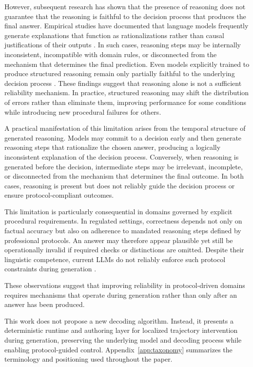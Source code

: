 \documentclass[twocolumn]{article}
\begin{document}
However, subsequent research has shown that the presence of reasoning does not
guarantee that the reasoning is faithful to the decision process that produces
the final answer. Empirical studies have documented that language models
frequently generate explanations that function as rationalizations rather than
causal justifications of their outputs
\parencite{lyu2023faithfulcot,paul2024makingreasoningmatter}. In such cases,
reasoning steps may be internally inconsistent, incompatible with domain rules,
or disconnected from the mechanism that determines the final prediction. Even
models explicitly trained to produce structured reasoning remain only partially
faithful to the underlying decision process \parencite{yun2025medprm}. These
findings suggest that reasoning alone is not a sufficient reliability mechanism.
In practice, structured reasoning may shift the distribution of errors rather
than eliminate them, improving performance for some conditions while introducing
new procedural failures for others.

A practical manifestation of this limitation arises from the temporal structure
of generated reasoning. Models may commit to a decision early and then generate
reasoning steps that rationalize the chosen answer, producing a logically
inconsistent explanation of the decision process. Conversely, when reasoning is
generated before the decision, intermediate steps may be irrelevant, incomplete,
or disconnected from the mechanism that determines the final outcome. In both
cases, reasoning is present but does not reliably guide the decision process or
ensure protocol-compliant outcomes.

This limitation is particularly consequential in domains governed by explicit
procedural requirements. In regulated settings, correctness depends not only on
factual accuracy but also on adherence to mandated reasoning steps defined by
professional protocols. An answer may therefore appear plausible yet still be
operationally invalid if required checks or distinctions are omitted. Despite
their linguistic competence, current LLMs do not reliably enforce such protocol
constraints during generation
\parencite{wei2022cot,yao2023react,liu2023trustworthy,lyu2023faithfulcot}.

These observations suggest that improving reliability in protocol-driven domains
requires mechanisms that operate during generation rather than only after an
answer has been produced.

This work does not propose a new decoding algorithm. Instead, it presents a
deterministic runtime and authoring layer for localized trajectory intervention
during generation, preserving the underlying model and decoding process while
enabling protocol-guided control. Appendix~\ref{app:taxonomy} summarizes the
terminology and positioning used throughout the paper. 
\end{document}
